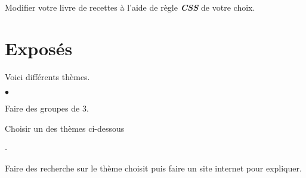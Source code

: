 \documentclass[10pt,dvipsnames, dvips, svgnames]{article}
\begin{document}
Modifier votre livre de recettes à l'aide de règle \textbf{\textit{CSS}} de votre choix.

\section{Exposés}

Voici différents thèmes. 

\begin{list}{$\bullet$}{}
\item Faire des groupes de 3.
\item Choisir un des thèmes ci-dessous
	\begin{list}{-}{}
	\item 
	\end{list}
\item Faire des recherche sur le thème choisit puis faire un site internet pour expliquer.
\end{list}
\end{document}
